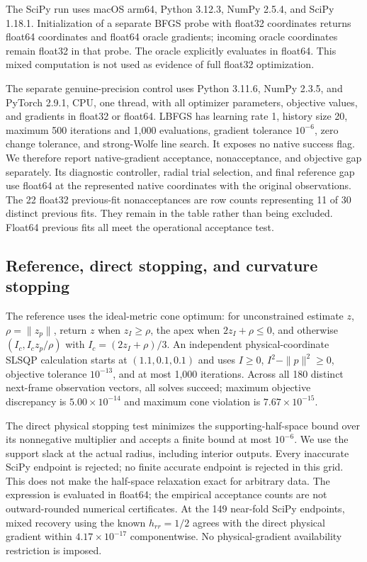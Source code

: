 The SciPy run uses macOS arm64, Python 3.12.3, NumPy 2.5.4, and SciPy 1.18.1. Initialization of a separate BFGS probe with float32 coordinates returns float64 coordinates and float64 oracle gradients; incoming oracle coordinates remain float32 in that probe. The oracle explicitly evaluates in float64. This mixed computation is not used as evidence of full float32 optimization.

The separate genuine-precision control uses Python 3.11.6, NumPy 2.3.5, and PyTorch 2.9.1, CPU, one thread, with all optimizer parameters, objective values, and gradients in float32 or float64. LBFGS has learning rate 1, history size 20, maximum 500 iterations and 1,000 evaluations, gradient tolerance $10^{-6}$, zero change tolerance, and strong-Wolfe line search. It exposes no native success flag. We therefore report native-gradient acceptance, nonacceptance, and objective gap separately. Its diagnostic controller, radial trial selection, and final reference gap use float64 at the represented native coordinates with the original observations. The 22 float32 previous-fit nonacceptances are row counts representing 11 of 30 distinct previous fits. They remain in the table rather than being excluded. Float64 previous fits all meet the operational acceptance test.

\subsection{Reference, direct stopping, and curvature stopping}
The reference uses the ideal-metric cone optimum: for unconstrained estimate $z$, $\rho=\|z_p\|$, return $z$ when $z_I\geq\rho$, the apex when $2z_I+\rho\leq0$, and otherwise $(I_c,I_c z_p/\rho)$ with $I_c=(2z_I+\rho)/3$. An independent physical-coordinate SLSQP calculation starts at $(1.1,0.1,0.1)$ and uses $I\geq0$, $I^2-\|p\|^2\geq0$, objective tolerance $10^{-13}$, and at most 1,000 iterations. Across all 180 distinct next-frame observation vectors, all solves succeed; maximum objective discrepancy is $5.00\times10^{-14}$ and maximum cone violation is $7.67\times10^{-15}$.

The direct physical stopping test minimizes the supporting-half-space bound over its nonnegative multiplier and accepts a finite bound at most $10^{-6}$. We use the support slack at the actual radius, including interior outputs. Every inaccurate SciPy endpoint is rejected; no finite accurate endpoint is rejected in this grid. This does not make the half-space relaxation exact for arbitrary data. The expression is evaluated in float64; the empirical acceptance counts are not outward-rounded numerical certificates. At the 149 near-fold SciPy endpoints, mixed recovery using the known $h_{rr}=1/2$ agrees with the direct physical gradient within $4.17\times10^{-17}$ componentwise. No physical-gradient availability restriction is imposed.

